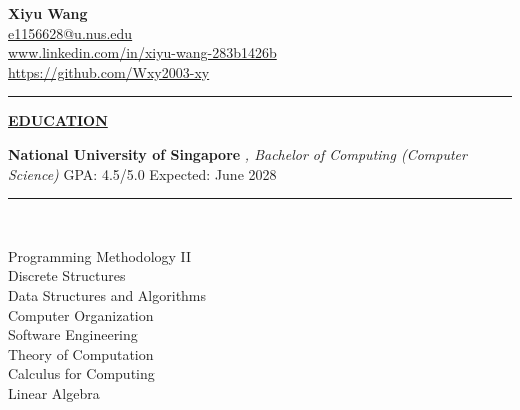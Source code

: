 \documentclass{article}
\begin{document}
\begin{center}
\thispagestyle{empty}
\large \textbf{Xiyu Wang} \\
\normalsize \href{mailto:e1156628@u.nus.edu}{e1156628@u.nus.edu} \\
\href{https://www.linkedin.com/in/xiyu-wang-283b1426b}{www.linkedin.com/in/xiyu-wang-283b1426b} \\
\href{https://github.com/Wxy2003-xy}{https://github.com/Wxy2003-xy}   
\noindent\rule{\linewidth}{0.4pt}
\end{center}

\vspace{0.2cm}

\noindent \textbf{\underline{EDUCATION}} \\
\vspace{-0.2cm}

\noindent\textbf{National University of Singapore} \textit{, Bachelor of Computing (Computer Science)} \hfill GPA: 4.5/5.0 {   } Expected: June 2028 \\
\vspace{-0.7cm} %

\noindent\rule{\linewidth}{0.4pt} %
\indent \text{} \\
\indent \text{} 
\vspace{-0.4cm} %
\begin{multicols}{2}
    \indent\indent\textbullet{} Programming Methodology II \\
    \indent\indent\textbullet{} Discrete Structures \\
    \indent\indent\textbullet{} Data Structures and Algorithms \\
    \indent\indent\textbullet{} Computer Organization \\
    \indent\indent\textbullet{} Software Engineering \\
    \indent\indent\textbullet{} Theory of Computation \\
    \indent\indent\textbullet{} Calculus for Computing \\
    \indent\indent\textbullet{} Linear Algebra
\end{multicols}

\vspace{0.1cm}
\end{document}
